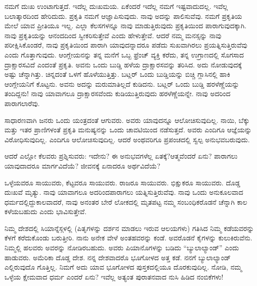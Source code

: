 \vskip 5pt

ನಮಗೆ ದುಃಖ ಉಂಟಾಗುತ್ತದೆ. ಇದೆಲ್ಲ ದುಃಖಮಯ. ಏಕೆಂದರೆ ಇದೆಲ್ಲ ನಮಗೆ ಇಷ್ಟವಾದುದಲ್ಲ. ಇವೆಲ್ಲ ಬಲಾತ್ಕಾರದಿಂದ ಹೇರಿದುದು. ಪ್ರಕೃತಿ ನಮಗೆ ಆಜ್ಞಾಪಿಸುವುದು. ನಾವು ಅದನ್ನು ಪಾಲಿಸುವೆವು. ನಮಗೆ ಪ್ರಕೃತಿಯ ಮೇಲೆ ಯಾವ ಪ್ರೀತಿಯೂ ಇಲ್ಲ. ಎಲ್ಲಾ ಕೆಲಸಗಳನ್ನೂ ನಾವು ಮಾಡುತ್ತಿರುವುದು ಪ್ರಕೃತಿಯಿಂದ ಪಾರಾಗುವುದಕ್ಕಾಗಿ. ನಾವು ಪ್ರಕೃತಿಯನ್ನು ಆನಂದದಿಂದ ಸ್ವೀಕರಿಸುತ್ತೇವೆ ಎಂದು ಹೇಳುತ್ತೇವೆ. ಆದರೆ ನಮ್ಮ ಮನಸ್ಸನ್ನು ನಾವು ಪರೀಕ್ಷಿಸಿಕೊಂಡರೆ, ನಾವು ಪ್ರಕೃತಿಯಿಂದ ಪಾರಾಗಿ ಯಾವುದನ್ನಾದರೂ ಪಡೆದು ಸುಖವಾಗಿರಲು ಪ್ರಯತ್ನಿಸುತ್ತಿರುವೆವು ಎಂದು ಗೊತ್ತಾಗುವುದು. ಆಂಗ್ಲೇಯನನ್ನು ತನ್ನ ಮನೆಗೆ ಒಬ್ಬ ಫ್ರೆಂಚ್​ ವ್ಯಕ್ತಿ ಕರೆದು, ತನ್ನ ಉಗ್ರಾಣದಲ್ಲಿ ಸೊಗಸಾದ ದ್ರಾಕ್ಷಾರಸವಿದೆ ಎಂದಂತೆ ಪ್ರಕೃತಿ. ಅವನು ಒಂದು ಬುಡ್ಡಿ ಹಳೆಯ ದ್ರಾಕ್ಷಾರಸವನ್ನು ತರಿಸಿದ. ಅದು ನೋಡುವುದಕ್ಕೆ ಅಷ್ಟು ಚೆನ್ನಾಗಿತ್ತು. ಚಿನ್ನದಂತೆ ಒಳಗೆ ಹೊಳೆಯುತ್ತಿತ್ತು. ಬಟ್ಲರ್​ ಒಂದು ಬುಡ್ಡಿಯನ್ನು ಬಿಚ್ಚಿ ಗ್ಲಾಸಿನಲ್ಲಿ ಹಾಕಿ ಆಂಗ್ಲೇಯನಿಗೆ ಕೊಟ್ಟನು. ಅವನು ಅದನ್ನು ಮರುಮಾತಿಲ್ಲದೆ ಕುಡಿದನು. ಬಟ್ಲರ್​ ಒಂದು ಬುಡ್ಡಿ ಹರಳೆಣ್ಣೆಯನ್ನು ತಂದಿದ್ದನು! ನಾವು ಯಾವಾಗಲೂ ದ್ರಾಕ್ಷಾರಸವೆಂದು ಕುಡಿಯುತ್ತಿರುವುದು ಹರಳೆಣ್ಣೆಯನ್ನೇ. ನಾವು ಅದರಿಂದ ಪಾರಾಗಲಾರೆವು.

\vskip 5pt

ಸಾಧಾರಣವಾಗಿ ಜನರು ಒಂದು ಯಂತ್ರದಂತೆ ಆಗುವರು. ಅವರು ಯಾವುದನ್ನೂ ಆಲೋಚಿಸುವುದಿಲ್ಲ. ನಾಯಿ, ಬೆಕ್ಕು ಮತ್ತು ಇತರ ಪ್ರಾಣಿಗಳಂತೆ ಪ್ರಕೃತಿ ಮನುಷ್ಯನನ್ನು ಒಂದು ಚಾವಟಿಯಿಂದ ನಡೆಸುತ್ತದೆ. ಅವರು ಎಂದಿಗೂ ಆಜ್ಞೆಯನ್ನು ವಿರೋಧಿಸುವುದಿಲ್ಲ. ಎಂದಿಗೂ ಆಲೋಚಿಸುವುದಿಲ್ಲ. ಆದರೆ ಅಂಥವರಿಗೂ ಪ್ರಪಂಚದಲ್ಲಿ ಸ್ವಲ್ಪ ಅನುಭವ\break ಬರುವುದು.

\vskip 5pt

ಆದರೆ ಎಲ್ಲೋ ಕೆಲವರು ಪ್ರಶ್ನಿಸುವರು: ಇದೇನು? ಈ ಅನುಭವಗಳೆಲ್ಲ ಏತಕ್ಕೆ?\break ಆತ್ಮವೆಂದರೆ ಏನು? ಪಾರಾಗಲು ಯಾವುದಾದರೂ ಮಾರ್ಗವಿದೆಯೆ? ಜೀವನಕ್ಕೆ ಏನಾದರೂ ಅರ್ಥವಿದೆಯೆ?

\vskip 5pt

ಒಳ್ಳೆಯವರೂ ಸಾಯುವರು, ಕೆಟ್ಟವರೂ ಸಾಯುವರು. ರಾಜರೂ ಸಾಯುವರು. ಭಿಕ್ಷುಕರೂ ಸಾಯುವರು. ದೊಡ್ಡ ದುಃಖವೆ ಮೃತ್ಯು. ನಾವು ಯಾವಾಗಲೂ ಅದರಿಂದ\break ಪಾರಾಗಲು ಯತ್ನಿಸುತ್ತಿರುವೆವು. ನಾವು ಒಂದು ಅನುಕೂಲವಾದ ಧರ್ಮದಲ್ಲಿದ್ದು\break ಕಾಲವಾದರೆ, ನಾವು ಅನಂತರ ಬೇರೆ ಲೋಕದಲ್ಲಿ ಮೃತಪಟ್ಟ ನಮ್ಮ ಸಂಬಂಧಿಕರೊಡನೆ ಚೆನ್ನಾಗಿ ಕಾಲ ಕಳೆಯಬಹುದು ಎಂದು ಭಾವಿಸುತ್ತೇವೆ.

\vskip 5pt

ನಿಮ್ಮ ದೇಶದಲ್ಲಿ ಸಿಯಾನ್ನೆಸ್ಗಳಲ್ಲಿ (ಪಿತೃಗಳನ್ನು ದರ್ಶನ ಮಾಡಲು ಇರುವ ಆಲಯಗಳು) ಗತಿಸಿದ ನಿಮ್ಮ ಕಡೆಯವರನ್ನು ಕೆಳಗೆ ಕರೆದುಕೊಂಡು ಬರುತ್ತೀರಿ. ನಾನು ಅನೇಕ ವೇಳೆ ಅಂತಹವರನ್ನು ಕಂಡೆ. ಅವರೊಡನೆ ಕೈಗಳನ್ನು ಕುಲುಕಿರುವೆನು. ನಿಮ್ಮಲ್ಲಿ ಹಲವರು ಅವರನ್ನು ನೋಡಿರಬಹುದು. ಅವರು ಪಿಯಾನೊಗಳನ್ನು ಬಡಿದು “ಬ್ಯುಲಾಲ್ಯಾಂಡ್​” ಎಂದು ಹಾಡುವರು. ಅಮೆರಿಕಾ ದೊಡ್ಡ ದೇಶ. ನನ್ನ ದೇಶವಾದರೊ ಭೂಗೋಳದ ಅತ್ತ ಕಡೆ. ನನಗೆ ಬ್ಯುಲಾಲ್ಯಾಂಡ್​ ಎಲ್ಲಿರುವುದೊ ಗೊತ್ತಿಲ್ಲ. ನಿಮಗೆ ಅದು ಯಾವ ಭೂಗೋಳದ ಪುಸ್ತಕದಲ್ಲಿಯೂ ದೊರಕುವುದಿಲ್ಲ. ನೋಡಿ, ನಮ್ಮ ಒಳ್ಳೆಯ ಕ್ಷೇಮವಾದ ಧರ್ಮ ಎಂದರೆ ಏನು? ಇವೆಲ್ಲ ಅತ್ಯಂತ ಪುರಾತನವಾದ ನುಸಿ ಹಿಡಿದ ನಂಬಿಕೆಗಳು!

\vskip 6pt

